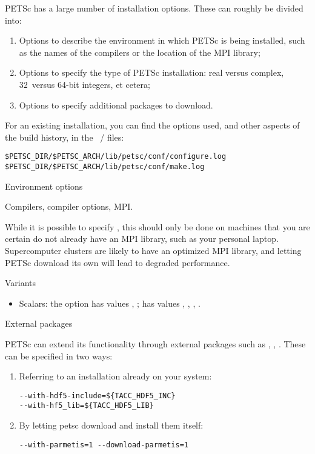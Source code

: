 PETSc has a large number of installation options. These can roughly be
divided into:
\begin{enumerate}
\item Options to describe the environment in which PETSc is being
  installed, such as the names of the compilers or the location of the
  MPI library;
\item Options to specify the type of PETSc installation: real versus
  complex, 32~versus 64-bit integers, et cetera;
\item Options to specify additional packages to download.
\end{enumerate}

For an existing installation, you can find the options used,
and other aspects of the build history,
in the ~/ 
files:
\begin{verbatim}
$PETSC_DIR/$PETSC_ARCH/lib/petsc/conf/configure.log
$PETSC_DIR/$PETSC_ARCH/lib/petsc/conf/make.log
\end{verbatim}

 {Environment options}

Compilers, compiler options, MPI.

While it is possible to specify ,
this should only be done on machines that you are certain do not
already have an MPI library, such as your personal
laptop. Supercomputer clusters are likely to have an optimized MPI
library, and letting PETSc download its own will lead to degraded
performance.

 {Variants}

\begin{itemize}
\item Scalars: the option  has values
  , ;  has values
  , , , .
\end{itemize}

 {External packages}
\label{sec:petsc-external}

PETSc can extend its functionality through external packages such as
, , . These can be
specified in two ways:
\begin{enumerate}
\item Referring to an installation already on your system:
\begin{verbatim}
--with-hdf5-include=${TACC_HDF5_INC}
--with-hf5_lib=${TACC_HDF5_LIB}
\end{verbatim}
\item By letting petsc download and install them itself:
\begin{verbatim}
--with-parmetis=1 --download-parmetis=1
\end{verbatim}
\end{enumerate}

